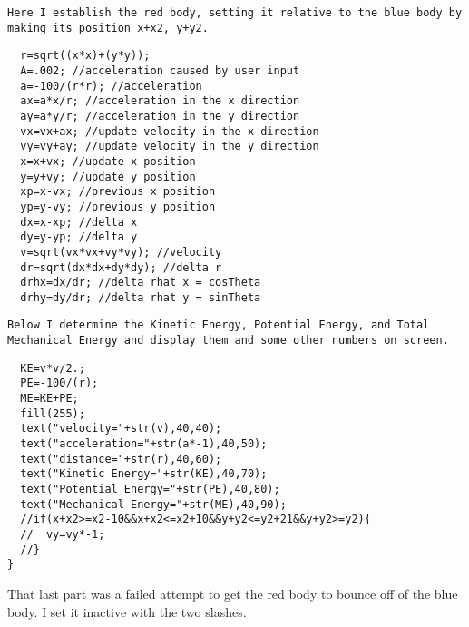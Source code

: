 \documentclass[paper=a4, fontsize=11pt]{scrartcl} %
\numberwithin{equation}{section} %
\numberwithin{figure}{section} %
\numberwithin{table}{section} %
\begin{document}
\normalsize
\begin{verbatim}
Here I establish the red body, setting it relative to the blue body by
making its position x+x2, y+y2.
\end{verbatim}
\begin{framed}
\footnotesize
\begin{verbatim}
  r=sqrt((x*x)+(y*y));
  A=.002; //acceleration caused by user input
  a=-100/(r*r); //acceleration
  ax=a*x/r; //acceleration in the x direction
  ay=a*y/r; //acceleration in the y direction
  vx=vx+ax; //update velocity in the x direction
  vy=vy+ay; //update velocity in the y direction
  x=x+vx; //update x position
  y=y+vy; //update y position
  xp=x-vx; //previous x position
  yp=y-vy; //previous y position
  dx=x-xp; //delta x
  dy=y-yp; //delta y
  v=sqrt(vx*vx+vy*vy); //velocity
  dr=sqrt(dx*dx+dy*dy); //delta r
  drhx=dx/dr; //delta rhat x = cosTheta
  drhy=dy/dr; //delta rhat y = sinTheta
\end{verbatim}
\end{framed}
\normalsize
\begin{verbatim}
Below I determine the Kinetic Energy, Potential Energy, and Total
Mechanical Energy and display them and some other numbers on screen.
\end{verbatim}
\begin{framed}
\footnotesize
\begin{verbatim}
  KE=v*v/2.;
  PE=-100/(r);
  ME=KE+PE;
  fill(255);
  text("velocity="+str(v),40,40);
  text("acceleration="+str(a*-1),40,50);
  text("distance="+str(r),40,60);
  text("Kinetic Energy="+str(KE),40,70);
  text("Potential Energy="+str(PE),40,80);
  text("Mechanical Energy="+str(ME),40,90);
  //if(x+x2>=x2-10&&x+x2<=x2+10&&y+y2<=y2+21&&y+y2>=y2){
  //  vy=vy*-1;
  //}
}
\end{verbatim}
\end{framed}
\normalsize
That last part was a failed attempt to get the red body to bounce off of the blue body.  I set
it inactive with the two slashes.
\end{document}
